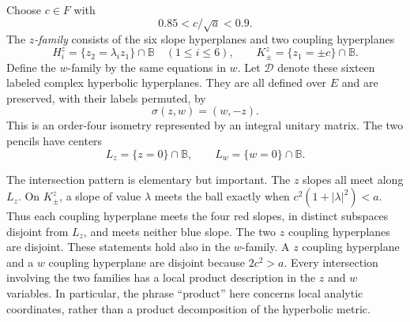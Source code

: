 \documentclass[11pt,reqno]{amsart}
\numberwithin{equation}{section}
\theoremstyle{definition}
\theoremstyle{remark}
\newcommand{\BB}{\mathbb B}
\newcommand{\cD}{\mathcal D}
\begin{document}
Choose $c\in F$ with
\begin{equation}\label{geo:coupling-size}
                 0.85<c/\sqrt a<0.9.
\end{equation}
The \emph{$z$-family} consists of the six slope hyperplanes and two
coupling hyperplanes
\[
 H^z_i=\{z_2=\lambda_i z_1\}\cap\BB\quad(1\le i\le6),
 \qquad K^z_\pm=\{z_1=\pm c\}\cap\BB.
\]
Define the $w$-family by the same equations in $w$.  Let $\cD$ denote
these sixteen labeled complex hyperbolic hyperplanes.  They are all
defined over $E$ and are preserved, with their labels permuted, by
\begin{equation}\label{geo:sigma}
                    \sigma(z,w)=(w,-z).
\end{equation}
This is an order-four isometry represented by an integral unitary
matrix.  The two pencils have centers
\[
 L_z=\{z=0\}\cap\BB,
 \qquad L_w=\{w=0\}\cap\BB.
\]

The intersection pattern is elementary but important.  The $z$ slopes
all meet along $L_z$.  On $K^z_\pm$, a slope of value $\lambda$ meets the
ball exactly when $c^2(1+|\lambda|^2)<a$.  Thus each coupling hyperplane
meets the four red slopes, in distinct subspaces disjoint from $L_z$,
and meets neither blue slope.  The two $z$ coupling hyperplanes are
disjoint.  These statements hold also in the $w$-family.  A $z$ coupling
hyperplane and a $w$ coupling hyperplane are disjoint because $2c^2>a$.
Every intersection involving the two families has a local product
description in the $z$ and $w$ variables.  In particular, the phrase
``product'' here concerns local analytic coordinates, rather than a
product decomposition of the hyperbolic metric.
\end{document}
